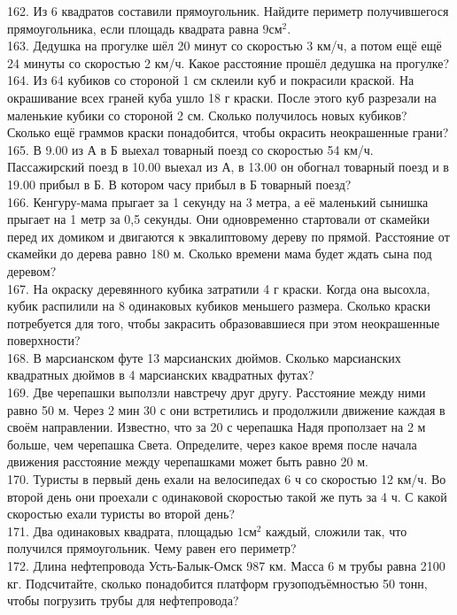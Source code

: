 162. Из 6 квадратов составили прямоугольник. Найдите периметр получившегося прямоугольника, если площадь квадрата равна $9\text{см}^2.$\\
163. Дедушка на прогулке шёл 20 минут со скоростью 3 км/ч, а потом ещё ещё 24 минуты со скоростью 2 км/ч. Какое расстояние прошёл дедушка на прогулке?\\
164. Из 64 кубиков со стороной 1 см склеили куб и покрасили краской. На окрашивание всех граней куба ушло 18 г краски. После этого куб разрезали на маленькие кубики со стороной 2 см. Сколько получилось новых кубиков? Сколько ещё граммов краски понадобится, чтобы окрасить неокрашенные грани?\\
165. В 9.00 из А в Б выехал товарный поезд со скоростью 54 км/ч. Пассажирский поезд в 10.00 выехал из А, в 13.00 он обогнал товарный поезд и в 19.00 прибыл в Б. В котором часу прибыл в Б товарный поезд?\\
166. Кенгуру-мама прыгает за 1 секунду на 3 метра, а её маленький сынишка прыгает на 1 метр за 0,5 секунды. Они одновременно стартовали от скамейки перед их домиком и двигаются к эвкалиптовому дереву по прямой. Расстояние от скамейки до дерева равно 180 м. Сколько времени мама будет ждать сына под деревом?\\
167. На окраску деревянного кубика затратили 4 г краски. Когда она высохла, кубик распилили на 8 одинаковых кубиков меньшего размера. Сколько краски потребуется для того, чтобы закрасить образовавшиеся при этом неокрашенные поверхности?\\
168. В марсианском футе 13 марсианских дюймов. Сколько марсианских квадратных дюймов в 4 марсианских квадратных футах?\\
169. Две черепашки выползли навстречу друг другу. Расстояние между ними равно 50 м. Через 2 мин 30 с они встретились и продолжили движение каждая в своём направлении. Известно, что за 20 с черепашка Надя проползает на 2 м больше, чем черепашка Света. Определите, через какое время после начала движения расстояние между черепашками может быть равно 20 м.\\
170. Туристы в первый день ехали на велосипедах 6 ч со скоростью 12 км/ч. Во второй день они проехали с одинаковой скоростью такой же путь за 4 ч. С какой скоростью ехали туристы во второй день?\\
171. Два одинаковых квадрата, площадью $1\text{см}^2$ каждый, сложили так, что получился прямоугольник. Чему равен его периметр?\\
172. Длина нефтепровода Усть-Балык-Омск 987 км. Масса 6 м трубы равна 2100 кг. Подсчитайте, сколько понадобится платформ грузоподъёмностью 50 тонн, чтобы погрузить трубы для нефтепровода?\\
